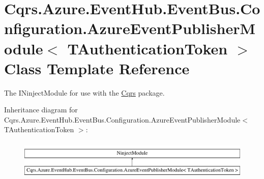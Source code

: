 \hypertarget{classCqrs_1_1Azure_1_1EventHub_1_1EventBus_1_1Configuration_1_1AzureEventPublisherModule}{}\section{Cqrs.\+Azure.\+Event\+Hub.\+Event\+Bus.\+Configuration.\+Azure\+Event\+Publisher\+Module$<$ T\+Authentication\+Token $>$ Class Template Reference}
\label{classCqrs_1_1Azure_1_1EventHub_1_1EventBus_1_1Configuration_1_1AzureEventPublisherModule}


The I\+Ninject\+Module for use with the \hyperlink{namespaceCqrs}{Cqrs} package.  


Inheritance diagram for Cqrs.\+Azure.\+Event\+Hub.\+Event\+Bus.\+Configuration.\+Azure\+Event\+Publisher\+Module$<$ T\+Authentication\+Token $>$\+:\begin{figure}[H]
\begin{center}
\leavevmode
\includegraphics[height=1.898305cm]{classCqrs_1_1Azure_1_1EventHub_1_1EventBus_1_1Configuration_1_1AzureEventPublisherModule}
\end{center}
\end{figure}
